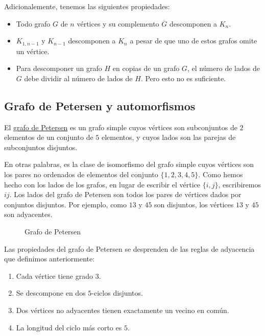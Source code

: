 Adicionalemente, tenemos las siguientes propiedades:

\begin{itemize}
    \item Todo grafo $G$ de $n$ vértices y su complemento $\overline{G}$ descomponen a $K_n$.
    \item $K_{1,n-1}$ y $K_{n-1}$ descomponen a $K_n$ a pesar de que uno de estos grafos omite un vértice.
    \item Para descomponer un grafo $H$ en copias de un grafo $G$, el número de lados de $G$ debe dividir al número de lados de $H$. Pero esto no es suficiente.
\end{itemize}

\subsection{Grafo de Petersen y automorfismos}

\begin{defn}
    El \ul{grafo de Petersen} es un grafo simple cuyos vértices son subconjuntos de $2$ elementos de un conjunto de $5$ elementos, y cuyos lados son las parejas de subconjuntos disjuntos.
    
    En otras palabras, es la clase de isomorfismo del grafo simple cuyos vértices son los pares no ordenados de elementos del conjunto $\{1,2,3,4,5\}$. Como hemos hecho con los lados de los grafos, en lugar de escribir el vértice $\{i,j\}$, escribiremos $ij$. Los lados del grafo de Petersen son todos los pares de vértices dados por conjuntos disjuntos. Por ejemplo, como $13$ y $45$ son disjuntos, los vértices $13$ y $45$ son adyacentes.
\end{defn}

\begin{figure}
    \centering
    \caption{Grafo de Petersen}
    \label{fig:petersen}
\end{figure}

\break

\begin{nota}
    Las propiedades del grafo de Petersen se desprenden de las reglas de adyacencia que definimos anteriormente:
    
    \begin{enumerate}
        \item Cada vértice tiene grado $3$.
        \item Se descompone en dos $5$-ciclos disjuntos.
        \item Dos vértices no adyacentes tienen exactamente un vecino en común.
        \item La longitud del ciclo más corto es $5$.
    \end{enumerate}
\end{nota}

